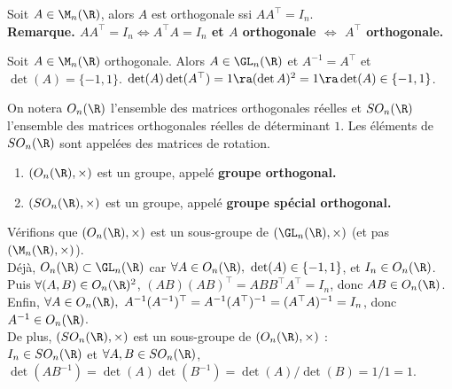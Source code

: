 \documentclass[11pt]{article}
\begin{document}
\begin{defi}{}{}
    Soit $A\in\M_n(\R)$, alors $A$ est orthogonale ssi $AA^\top=I_n$.\\
    \bf{Remarque.} $AA^\top=I_n \iff A^\top A=I_n$ et $A$ orthogonale $\iff$ $A^\top$ orthogonale.
\end{defi}

\vspace*{-0.7cm}

\begin{prop}{}{}
    Soit $A\in\M_n(\R)$ orthogonale. Alors $A\in\GL_n(\R)$ et $A^{-1}=A^\top$ et $\det(A)=\{-1,1\}$.
    \tcblower
    $\det(A)\det(A^\top)=1 \ra (\det A)^2 = 1 \ra \det(A)\in\{-1,1\}$.
\end{prop}

\vspace*{-0.7cm}

\begin{nota}{}{}
    On notera $O_n(\R)$ l'ensemble des matrices orthogonales réelles et $SO_n(\R)$ l'ensemble des matrices orthogonales réelles de déterminant $1$. Les éléments de $SO_n(\R)$ sont appelées des matrices de rotation.
\end{nota}

\vspace*{-0.7cm}

\begin{prop}{}{}
    \begin{enumerate}
        \item $(O_n(\R),\times)$ est un groupe, appelé \bf{groupe orthogonal}.
        \item $(SO_n(\R),\times)$ est un groupe, appelé \bf{groupe spécial orthogonal}.
    \end{enumerate}
    \tcblower
    Vérifions que $(O_n(\R),\times)$ est un sous-groupe de $(\GL_n(\R),\times)$ (et pas $(\M_n(\R), \times)$).\\
    Déjà, $O_n(\R)\subset \GL_n(\R)$ car $\forall A \in O_n(\R), ~ \det(A)\in\{-1,1\}$, et $I_n\in O_n(\R)$.\\
    Puis $\forall (A,B) \in O_n(\R)^2$, $(AB)(AB)^\top=ABB^\top A^\top=I_n$, donc $AB\in O_n(\R)$.\\
    Enfin, $\forall A \in O_n(\R), ~ A^{-1}(A^{-1})^\top=A^{-1}(A^\top)^{-1}=(A^\top A)^{-1}=I_n$, donc $A^{-1}\in O_n(\R)$.\\
    De plus, $(SO_n(\R),\times)$ est un sous-groupe de $(O_n(\R),\times)$ :\\
    $I_n\in SO_n(\R)$ et $\forall A,B \in SO_n(\R)$, $\det(AB^{-1})=\det(A)\det(B^{-1})=\det(A)/\det(B)=1/1=1$.
\end{prop}
\end{document}
